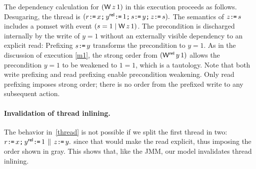 The dependency calculation for $(\DW{z}{1})$ in this execution proceeds as
follows.  Desugaring, the thread is
\begin{math}
  (r\texttt{:}\mkern-1mu\texttt{=}\, x\texttt{;}\,
  y^{\mathsf{rel}}\texttt{:}\mkern-1mu\texttt{=}\, 1\texttt{;}\,
  s\texttt{:}\mkern-1mu\texttt{=}\, y\texttt{;}\,
  z\texttt{:}\mkern-1mu\texttt{=}\, s).
\end{math}
The semantics of $z\texttt{:}\mkern-1mu\texttt{=}\, s$ includes a pomset with event
$(\bReg=1\mid \DW{z}{1})$. The precondition is discharged internally by the
write of $y=1$ without an externally visible dependency to an explicit read:
Prefixing $s\texttt{:}\mkern-1mu\texttt{=}\, y$ transforms the precondition to $y=1$.  As in the
discussion of execution \eqref{m1}, the strong order from $(\DWRel{y}{1})$
allows the precondition $y=1$ to be weakened to $1=1$, which is a tautology.
Note that both write prefixing and read prefixing enable precondition
weakening.  Only read prefixing imposes strong order; there is no order from
the prefixed write to any subsequent action.

\paragraph*{Invalidation of thread inlining. }
The behavior in~\ref{thread} is not possible if we split the first
thread in two:
\begin{math}
  r\texttt{:}\mkern-1mu\texttt{=}\, x\texttt{;}\,
  y^{\mathsf{rel}}\texttt{:}\mkern-1mu\texttt{=}\, 1\,\mathbin{\|}\,
  z\texttt{:}\mkern-1mu\texttt{=}\, y.
\end{math}
since that would make the read explicit, thus imposing the order
shown in gray.   This shows that, like the JMM, our model invalidates thread
inlining.


